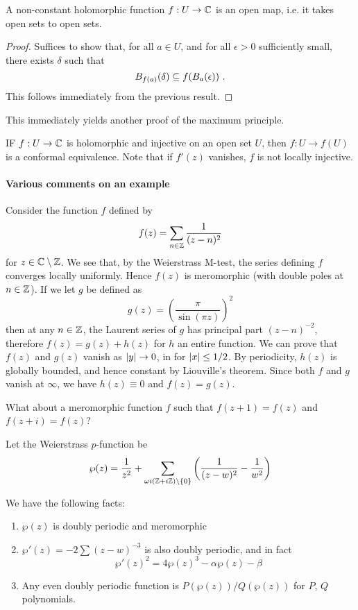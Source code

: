 \begin{corollary}
 A non-constant holomorphic function $f : U \rightarrow \mathbb{C}$ is an open map, i.e. it takes open sets to open sets.
\end{corollary}

\begin{proof}
  Suffices to show that, for all $a \in U$, and for all $\epsilon > 0$ sufficiently small, there exists $\delta$ such that
\[
B_{f(a)}(\delta) \subseteq f(B_a(\epsilon)) \ \text{.}
\]
This follows immediately from the previous result.
\end{proof}

\begin{remark}
  This immediately yields another proof of the maximum principle.
\end{remark}

\begin{remark}
  IF $f : U \rightarrow \mathbb{C}$  is holomorphic and injective on an open set $U$, then $f : U \rightarrow f(U)$ is a conformal equivalence.
  Note that if $f'(z)$ vanishes, $f$ is not locally injective.
\end{remark}

\paragraph{Various comments on an example}
Consider the function $f$ defined by
\[
f(z) = \sum_{n \in \mathbb{Z}} \frac{1}{(z - n)^2}
\]
for $z \in \mathbb{C} \setminus \mathbb{Z}$.
We see that, by the Weierstrass M-test, the series defining $f$ converges locally uniformly.
Hence $f(z)$ is meromorphic (with double poles at $n \in \mathbb{Z}$).
If we let $g$ be defined as
\[
g(z) = \left( \frac{\pi}{\sin (\pi z)} \right)^2
\]
then at any $n \in \mathbb{Z}$, the Laurent series of $g$ has principal part $(z - n)^{-2}$, therefore $f(z) = g(z) + h(z)$ for $h$ an entire function.
We can prove that $f(z)$ and $g(z)$ vanish as $\lvert y\rvert \rightarrow 0$, in for $\lvert x\rvert \leq 1/2$.
By periodicity, $h(z)$ is globally bounded, and hence constant by Liouville's theorem.
Since both $f$ and $g$ vanish at $\infty$, we have $h(z) \equiv 0$  and $f(z) = g(z)$.

What about a meromorphic function $f$ such that $f(z + 1) = f(z)$ and $f(z + i) = f(z)$?

\begin{definition}
  Let the Weierstrass $p$-function be
\[
\wp(z) = \frac{1}{z^2} + \sum_{\omega i ( \mathbb{Z} + i \mathbb{Z}) \setminus \{ 0 \}} \left( \frac{1}{(z - w)^2} - \frac{1}{w^2} \right)
\]
\end{definition}

We have the following facts:
\begin{enumerate}
\item $\wp(z)$ is doubly periodic and meromorphic
\item $\wp'(z) = -2 \sum (z - w)^{-3}$ is also doubly periodic, and in fact
\[
\wp'(z)^2 = 4 \wp(z)^3 - \alpha \wp(z) - \beta
\]
\item Any even doubly periodic function is $P(\wp(z))/Q(\wp(z))$ for $P$, $Q$ polynomials.
\end{enumerate}



